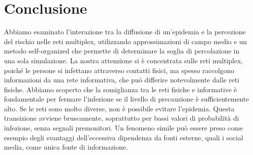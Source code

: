 \section{Conclusione}\label{sec:conclusione}
    Abbiamo esaminato l'interazione tra la diffusione di un'epidemia e la percezione del rischio nelle reti multiplex,
    utilizzando approssimazioni di campo medio e un metodo self-organized che permette di determinare la soglia
    di percolazione in una sola simulazione.
    La nostra attenzione si è concentrata sulle reti multiplex, poiché le persone si infettano attraverso contatti
    fisici, ma spesso raccolgono informazioni da una rete informativa, che può differire notevolmente dalle reti fisiche.
    Abbiamo scoperto che la somiglianza tra le reti fisiche e informative è fondamentale per fermare l'infezione se il
    livello di precauzione è sufficientemente alto.
    Se le reti sono molto diverse, non è possibile evitare l'epidemia.
    Questa transizione avviene bruscamente, soprattutto per bassi valori di probabilità di infezione, senza segnali
    premonitori.
    Un fenomeno simile può essere preso come esempio degli svantaggi dell'eccessiva dipendenza da fonti esterne,
    quali i social media, come unica fonte di informazione.